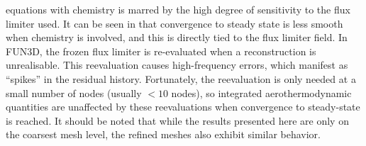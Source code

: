 equations with chemistry is marred by the high degree of sensitivity to the flux
limiter used.  It can be seen in  that convergence
to
steady state is less smooth when chemistry is involved, and this is directly
tied to the flux limiter field.  In FUN3D, the frozen flux limiter is
re-evaluated when a reconstruction is unrealisable.  This reevaluation causes
high-frequency errors, which manifest as ``spikes'' in the residual history.
Fortunately, the reevaluation is only needed at a small number of nodes
(usually $< 10$ nodes), so integrated aerothermodynamic quantities are
unaffected by these reevaluations when convergence to steady-state is reached.
It should be noted that while the results presented here are only on the
coarsest mesh level, the refined meshes also exhibit similar behavior.

